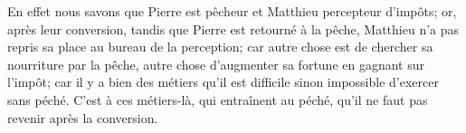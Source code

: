En effet nous savons que Pierre est pêcheur et Matthieu percepteur d’impôts;
	or, après leur conversion, tandis que Pierre est retourné à la pêche,
	Matthieu n’a pas repris sa place au bureau de la perception;
	car autre chose est de chercher sa nourriture par la pêche,
	autre chose d’augmenter sa fortune en gagnant sur l’impôt;
	car il y a bien des métiers
		qu’il est difficile sinon impossible d’exercer sans péché.
C’est à ces métiers-là, qui entraînent au péché,
	qu’il ne faut pas revenir après la conversion.
